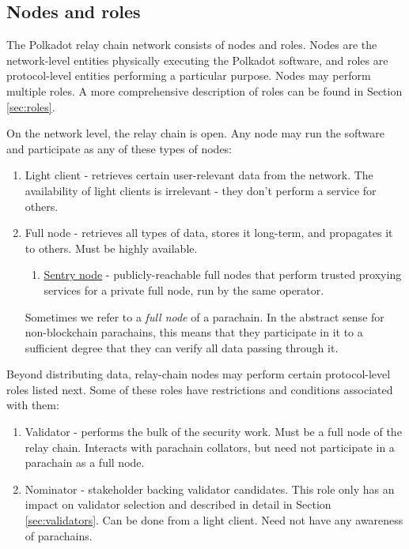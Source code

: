 \subsection{Nodes and roles}

The Polkadot relay chain network consists of nodes and roles. Nodes are the network-level entities physically executing the Polkadot software, and roles are protocol-level entities performing a particular purpose. Nodes may perform multiple roles. A more comprehensive description of roles can be found in Section \ref{sec:roles}. 

On the network level, the relay chain is open. Any node may run the software and participate as any of these types of nodes:

\begin{enumerate}
\item Light client - retrieves certain user-relevant data from the network. The availability of light clients is irrelevant - they don't perform a service for others.
\item Full node - retrieves all types of data, stores it long-term, and propagates it to others. Must be highly available.
  \begin{enumerate}
  \item \hyperref[sec:net_sentry]{Sentry node} - publicly-reachable full nodes that perform trusted proxying services for a private full node, run by the same operator.
  \end{enumerate}
Sometimes we refer to a \emph{full node} of a parachain. In the abstract sense for non-blockchain parachains, this means that they participate in it to a sufficient degree that they can verify all data passing through it.
\end{enumerate}

Beyond distributing data, relay-chain nodes may perform certain protocol-level roles listed next. Some of these roles have restrictions and conditions associated with them:

\begin{enumerate}
\item Validator - performs the bulk of the security work. Must be a full node of the relay chain. Interacts with parachain collators, but need not participate in a parachain as a full node. %
\item Nominator - stakeholder backing validator candidates. This role only has an impact on validator selection and described in detail in Section \ref{sec:validators}. Can be done from a light client. Need not have any awareness of parachains.
\end{enumerate}

